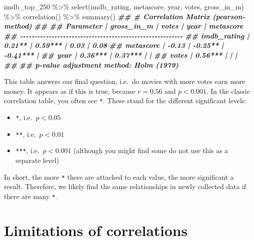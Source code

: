 \documentclass[
]{book}
\newenvironment{Shaded}{\begin{snugshade}}{\end{snugshade}}
\newcommand{\DocumentationTok}[1]{\textcolor[rgb]{0.56,0.35,0.01}{\textbf{\textit{#1}}}}
\newcommand{\FunctionTok}[1]{\textcolor[rgb]{0.00,0.00,0.00}{#1}}
\newcommand{\NormalTok}[1]{#1}
\newcommand{\SpecialCharTok}[1]{\textcolor[rgb]{0.00,0.00,0.00}{#1}}
\begin{document}
\begin{Shaded}
\begin{Highlighting}[]
\NormalTok{imdb\_top\_250 }\SpecialCharTok{\%\textgreater{}\%} 
  \FunctionTok{select}\NormalTok{(imdb\_rating, metascore, year, votes, gross\_in\_m) }\SpecialCharTok{\%\textgreater{}\%} 
  \FunctionTok{correlation}\NormalTok{() }\SpecialCharTok{\%\textgreater{}\%} 
  \FunctionTok{summary}\NormalTok{()}
\DocumentationTok{\#\# \# Correlation Matrix (pearson{-}method)}
\DocumentationTok{\#\# }
\DocumentationTok{\#\# Parameter   | gross\_in\_m |   votes |     year | metascore}
\DocumentationTok{\#\# {-}{-}{-}{-}{-}{-}{-}{-}{-}{-}{-}{-}{-}{-}{-}{-}{-}{-}{-}{-}{-}{-}{-}{-}{-}{-}{-}{-}{-}{-}{-}{-}{-}{-}{-}{-}{-}{-}{-}{-}{-}{-}{-}{-}{-}{-}{-}{-}{-}{-}{-}{-}{-}{-}{-}{-}{-}}
\DocumentationTok{\#\# imdb\_rating |     0.21** | 0.59*** |     0.03 |      0.08}
\DocumentationTok{\#\# metascore   |      {-}0.13 | {-}0.25** | {-}0.41*** |          }
\DocumentationTok{\#\# year        |    0.36*** | 0.37*** |          |          }
\DocumentationTok{\#\# votes       |    0.56*** |         |          |          }
\DocumentationTok{\#\# }
\DocumentationTok{\#\# p{-}value adjustment method: Holm (1979)}
\end{Highlighting}
\end{Shaded}

This table answers our final question, i.e.~do movies with more votes earn more money. It appears as if this is true, because \(r = 0.56\) and \(p < 0.001\). In the classic correlation table, you often see \texttt{*}. These stand for the different significant levels:

\begin{itemize}
\item
  \texttt{*}, i.e.~\(p < 0.05\)
\item
  \texttt{**}, i.e.~\(p < 0.01\)
\item
  \texttt{***}, i.e.~\(p < 0.001\) (although you might find some do not use this as a separate level)
\end{itemize}

In short, the more \texttt{*} there are attached to each value, the more significant a result. Therefore, we likely find the same relationships in newly collected data if there are many \texttt{*}.

\hypertarget{limitations-of-correlations}{%
\section{Limitations of correlations}\label{limitations-of-correlations}}
\end{document}
